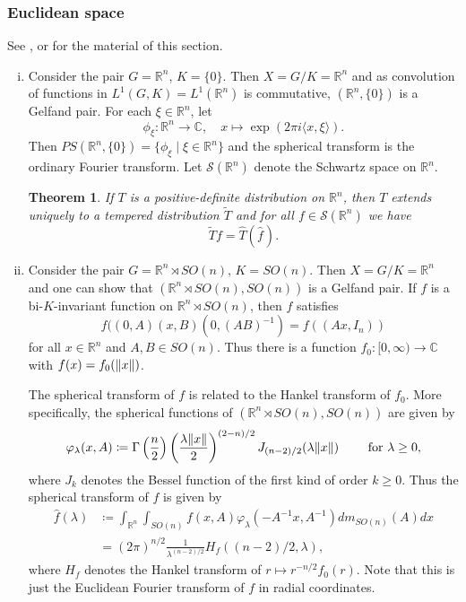 \documentclass[12pt,reqno,a4paper]{amsart}
\theoremstyle{theorem}
\newtheorem{theorem}{Theorem}[section]
\theoremstyle{definition}
\numberwithin{theorem}{section}
\numberwithin{equation}{section}
\newcommand{\R}{\mathbb{R}}
\newcommand{\C}{\mathbb{C}}
\DeclarePairedDelimiter{\norm}{\lVert}{\rVert}
\begin{document}
\subsubsection{Euclidean space}
See \cite{vanDijk}, \cite{Wolf} or \cite{AnkerDunklTheory} for the material of this section.
\begin{enumerate}[(i)]
	\item Consider the pair $G=\R^n$, $K=\{0\}$. Then $X = G/K = \R^n$ and as convolution of functions in $L^1(G, K) = L^1(\R^n)$ is commutative, $(\R^n, \{0\})$ is a Gelfand pair. For each $\xi\in \R^n$, let 
	\[\phi_\xi:\R^n\to \C,\quad x\mapsto \exp(2\pi i\langle x, \xi\rangle).\]
	Then $PS(\R^n, \{0\}) = \{\phi_\xi\mid \xi\in \R^n\}$ and the spherical transform is the ordinary Fourier transform. 
	Let $\mathscr{S}(\R^n)$ denote the Schwartz space on $\R^n$.
	\begin{theorem}\label{t:euclidean_Bochner_Schwartz}
		If $T$ is a positive-definite distribution on $\R^n$, then $T$ extends uniquely to a tempered distribution $\tilde{T}$ and for all $f\in \mathscr{S}(\R^n)$ we have
		\[\tilde{T}f = \widehat{T}(\widehat{f}\hspace{1pt}).\]
	\end{theorem}
	\item Consider the pair $G=\R^n\rtimes SO(n)$, $K=SO(n)$. Then $X=G/K=\R^n$ and one can show that $(\R^n\rtimes SO(n), SO(n))$ is a Gelfand pair. 
	If $f$ is a bi-$K$-invariant function on $\R^n\rtimes SO(n)$, then $f$ satisfies
	\[f((0,A)(x, B)(0, (AB)^{-1}) = f((Ax, I_n))\]
	for all $x\in \R^n$ and $A,B\in SO(n)$. Thus there is a function $f_0:[0,\infty)\to \C$ with $f(x)= f_0(\norm{x})$.
	
	The spherical transform of $f$ is related to the Hankel transform of $f_0$.
	More specifically, the spherical functions of $(\R^n\rtimes SO(n), SO(n))$ are given by
	\[\varphi_\lambda(x, A)\coloneqq \Gamma\left(\frac{n}{2}\right)\left(\frac{\lambda\norm{x}}{2}\right)^{(2-n)/2}J_{(n-2)/2}(\lambda\norm{x})\qquad\text{ for }\lambda\geq 0,\]
	where $J_{k}$ denotes the Bessel function of the first kind of order $k\geq 0$. 
	Thus the spherical transform of $f$ is given by
	\begin{align*}
		\widehat{f}(\lambda)&\coloneqq \int_{\R^n}\int_{SO(n)} f(x,A)\varphi_\lambda(-A^{-1}x,A^{-1})dm_{SO(n)}(A)dx\\
		&= (2\pi)^{n/2}\frac{1}{\lambda^{(n-2)/2}}H_f((n-2)/2,\lambda),
	\end{align*}
	where $H_f$ denotes the Hankel transform of $r\mapsto r^{-n/2}f_0(r)$. Note that this is just the Euclidean Fourier transform of $f$ in radial coordinates.
\end{enumerate}
\end{document}
